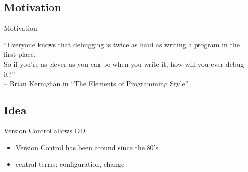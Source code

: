 \subsection{Motivation}
\begin{frame}{Motivation}
	\begin{center}
		\enquote{Everyone knows that debugging is twice as hard as writing a program in the first place. \\[1.5em] So if you're as clever as you can be when you write it, how will you ever debug it?} \\[3em]
		-- Brian Kernighan in ``The Elements of Programming Style''
	\end{center}
\end{frame}


\subsection{Idea}
\begin{frame}{Version Control allows DD}
	\begin{itemize}
		\item Version Control has been around since the 80's
		\item central terms: configuration, change
	\end{itemize}
\end{frame}

